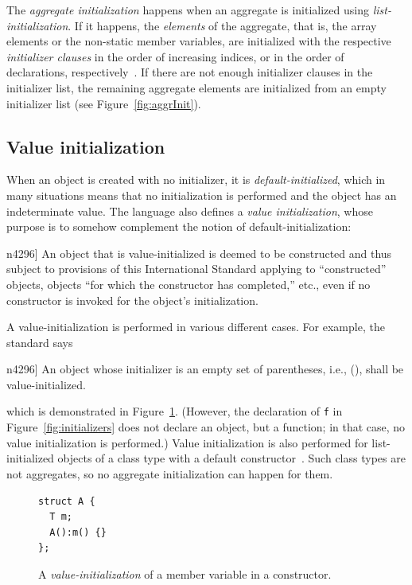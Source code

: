 \documentclass[nolot,nolof,nocover,printed]{fithesis3}
\newcommand{\stdN}[2]{\cite[#2]{#1}\xspace}
\begin{document}
The \textit{aggregate initialization} happens when an aggregate is initialized using \textit{list-initialization}. If it happens, the \textit{elements} of the aggregate, that is, the array elements or the non-static member variables, are initialized with the respective \textit{initializer clauses} in the order of increasing indices, or in the order of declarations, respectively~\stdN{n4296}{\S 8.5.1/2}. If there are not enough initializer clauses in the initializer list, the remaining aggregate elements are initialized from an empty initializer list (see Figure~\ref{fig:aggrInit}).

\subsection{Value initialization}

When an object is created with no initializer, it is \textit{default-initialized}, which in many situations means that no initialization is performed and the object has an indeterminate value. The language also defines a \textit{value initialization}, whose purpose is to somehow complement the notion of default-initialization:
\begin{displayquote}[\stdN{n4296}{\S 8.5/8}]
\textelp{} An object that is value-initialized is deemed to be constructed and thus subject to provisions of this International Standard applying to \enquote{constructed} objects, objects \enquote{for which the constructor has completed,} etc., even if no constructor is invoked for the object’s initialization.
\end{displayquote}

A value-initialization is performed in various different cases. For example, the standard says
\begin{displayquote}[\stdN{n4296}{\S 8.5/11}]
An object whose initializer is an empty set of parentheses, i.e., (), shall be value-initialized.\textelp{}
\end{displayquote}
which is demonstrated in Figure~\ref{fig:valueInitMember}. (However, the declaration of \texttt{f} in Figure~\ref{fig:initializers} does not declare an object, but a function; in that case, no value initialization is performed.) Value initialization is also performed for list-initialized objects of a class type with a default constructor~\stdN{n4296}{\S 8.5.4/5.4}. Such class types are not aggregates, so no aggregate initialization can happen for them.

\begin{figure}[ht]
\begin{lstlisting}
struct A {
  T m;
  A():m() {}
};
\end{lstlisting}
\caption{A \textit{value-initialization} of a member variable in a constructor.}
\label{fig:valueInitMember}
\end{figure}
\end{document}
